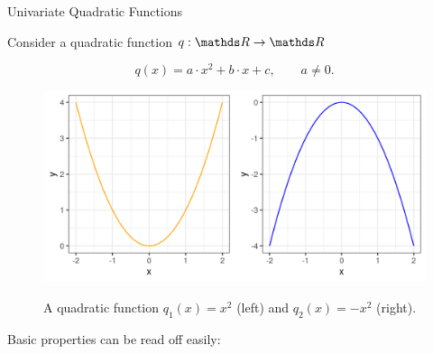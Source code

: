 \begin{vbframe}{Univariate Quadratic Functions}

  Consider a quadratic function $q: \R \to \R$
  
  $$
    q(x) = a \cdot x^2 + b \cdot x + c, \qquad a \ne 0.
  $$
  
  
  \begin{figure}
    \includegraphics[height=0.3\textwidth, keepaspectratio]{figure_man/quadratic_functions_1D.png} \\
    \begin{footnotesize} 
    A quadratic function $q_1(x) = x^2$ (left) and $q_2(x) = - x^2$ (right). 
    \end{footnotesize}
  \end{figure}
  
  \framebreak 
  
  Basic properties can be read off easily: 
  

\end{vbframe}
